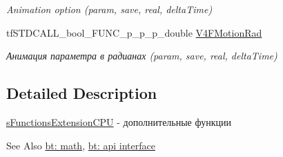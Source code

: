 \begin{DoxyCompactItemize}
\begin{DoxyCompactList}\small\item\em Animation option (param, save, real, delta\-Time) \end{DoxyCompactList}\item 
\hypertarget{structs_functions_extension_c_p_u_a24b2968825635c2c55a37dfc4dbd84b8}{tf\-S\-T\-D\-C\-A\-L\-L\-\_\-bool\-\_\-\-F\-U\-N\-C\-\_\-p\-\_\-p\-\_\-p\-\_\-double \hyperlink{structs_functions_extension_c_p_u_a24b2968825635c2c55a37dfc4dbd84b8}{V4\-F\-Motion\-Rad}}\label{structs_functions_extension_c_p_u_a24b2968825635c2c55a37dfc4dbd84b8}

\begin{DoxyCompactList}\small\item\em Анимация параметра в радианах (param, save, real, delta\-Time) \end{DoxyCompactList}\end{DoxyCompactItemize}


\subsection{Detailed Description}
\hyperlink{structs_functions_extension_c_p_u}{s\-Functions\-Extension\-C\-P\-U} -\/ дополнительные функции 

\begin{DoxySeeAlso}{See Also}
\hyperlink{group__math}{bt\-: math}, \hyperlink{group__apiinterface}{bt\-: api interface} 
\end{DoxySeeAlso}


